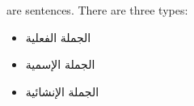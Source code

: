 \documentclass[../main.tex]{subfiles}
\begin{document}
\begin{english}
     are sentences. There are three types:
	\begin{itemize}
		\item \textarabic{الجملة الفعلية}
		\item \textarabic{الجملة الإسمية}
		\item \textarabic{الجملة الإنشائية}
	\end{itemize}
\end{english}
\end{document}
